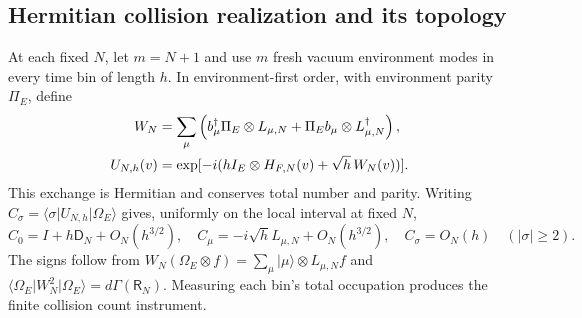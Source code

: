 \documentclass[11pt,letterpaper]{article}
\numberwithin{equation}{section}
\theoremstyle{remark}
\newcommand{\ket}[1]{\lvert #1\rangle}
\newcommand{\bra}[1]{\langle #1\rvert}
\newcommand{\loss}{\mathsf R}
\begin{document}
\subsection{Hermitian collision realization and its topology}
At each fixed $N$, let $m=N+1$ and use $m$ fresh vacuum environment
modes in every time bin of length $h$. In environment-first order,
with environment parity $\Pi_E$, define
\begin{align}
 W_N&=\sum_\mu\left(b_\mu^\dagger\Pi_E\otimes L_{\mu,N}
             +\Pi_Eb_\mu\otimes L_{\mu,N}^\dagger\right),\notag\\
 U_{N,h}(v)&=\exp[-i(hI_E\otimes H_{F,N}(v)+\sqrt h\,W_N(v))].
 \label{eq:collision}
\end{align}
This exchange is Hermitian and conserves total number and parity.
Writing $C_\sigma=\bra\sigma U_{N,h}\ket{\Omega_E}$ gives, uniformly
on the local interval at fixed $N$,
\begin{equation}
 C_0=I+h\mathsf D_N+O_N(h^{3/2}),\quad
 C_\mu=-i\sqrt h L_{\mu,N}+O_N(h^{3/2}),\quad
 C_\sigma=O_N(h)\quad(|\sigma|\ge2). \label{eq:blocks}
\end{equation}
The signs follow from
$W_N(\Omega_E\otimes f)=\sum_\mu\ket\mu\otimes L_{\mu,N}f$ and
$\bra{\Omega_E}W_N^2\ket{\Omega_E}=d\Gamma(\loss_N)$.
Measuring each bin's total occupation produces the finite collision
count instrument.
\end{document}
